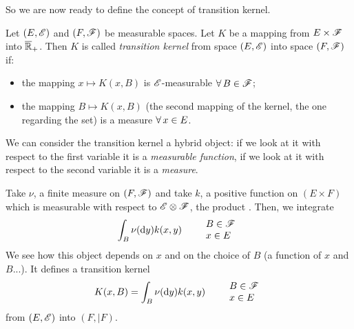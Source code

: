 \documentclass{report}
\begin{document}
So we are now ready to define the concept of transition kernel.
\begin{definition}
	Let $(E,\mathscr{E})$ and $(F,\mathscr{F})$ be measurable spaces. Let $K$ be a mapping from $E\times\mathscr{F}$ into $\overline{\mathbb{R}}_+$. Then $K$ is called \emph{transition kernel} from space $(E,\mathscr{E})$ into space $(F,\mathscr{F})$ if:
	\begin{itemize}
		\item the mapping $x\mapsto K(x,B)$ is $\mathscr{E}$-measurable $\forall\, B\in\mathscr{F}$;
		\item the mapping $B\mapsto K(x,B)$ (the second mapping of the kernel, the one regarding the set) is a measure $\forall\, x\in E$.
	\end{itemize}
\end{definition}
We can consider the transition kernel a hybrid object: if we look at it with respect to the first variable it is a \textit{measurable function}, if we look at it with respect to the second variable it is a \textit{measure}.
\begin{example}
	Take $\nu$, a finite measure on $(F,\mathscr{F})$ and take $k$, a positive function on $(E\times F)$ which is measurable with respect to $\mathscr{E}\otimes\mathscr{F}$, the product \sa{}. Then, we integrate
	\[\int_B\nu(\mathop{}\!\mathrm{d} y)k(x,y)\qquad\begin{array}{l}
		B\in\mathscr{F}\\
		x\in E
	\end{array}\]
	We see how this object depends on $x$ and on the choice of $B$ (a function of $x$ and $B$...). It defines a transition kernel
	\[K(x,B)=\int_B\nu(\mathop{}\!\mathrm{d} y)k(x,y)\qquad\begin{array}{l}
		B\in\mathscr{F}\\
		x\in E
	\end{array}\]
	from $(E,\mathscr{E})$ into $(F,|F)$.
\end{example}
\end{document}
